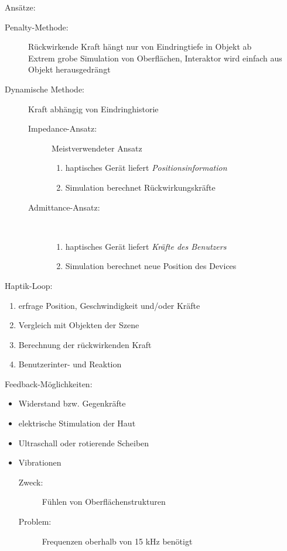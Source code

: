 \documentclass[a4paper, 12pt]{article}
\begin{document}
Ansätze:
\begin{description}
  \item[Penalty-Methode:] Rückwirkende Kraft hängt nur von Eindringtiefe in Objekt ab\\
    Extrem grobe Simulation von Oberflächen, Interaktor wird einfach aus Objekt herausgedrängt
  \item[Dynamische Methode:] Kraft abhängig von Eindringhistorie
    \begin{description}
      \item[Impedance-Ansatz:] Meistverwendeter Ansatz
        \begin{enumerate}
          \item haptisches Gerät liefert \emph{Positionsinformation}
          \item Simulation berechnet Rückwirkungskräfte
        \end{enumerate}
      \item[Admittance-Ansatz:]~
        \begin{enumerate}
          \item haptisches Gerät liefert \emph{Kräfte des Benutzers}
          \item Simulation berechnet neue Position des Devices
        \end{enumerate}
    \end{description}
\end{description}
Haptik-Loop:
\begin{enumerate}
  \item erfrage Position, Geschwindigkeit und/oder Kräfte
  \item Vergleich mit Objekten der Szene
  \item Berechnung der rückwirkenden Kraft
  \item Benutzerinter- und Reaktion
\end{enumerate}
Feedback-Möglichkeiten:
\begin{itemize}
  \item Widerstand bzw. Gegenkräfte
  \item elektrische Stimulation der Haut
  \item Ultraschall oder rotierende Scheiben
  \item Vibrationen
    \begin{description}
      \item[Zweck:] Fühlen von Oberflächenstrukturen
      \item[Problem:] Frequenzen oberhalb von 15 kHz benötigt
    \end{description}
\end{itemize}
\end{document}
